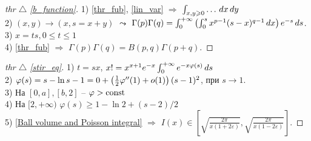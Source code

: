 \begin{minipage}[]{0.45\textwidth}
\begin{proof}[
thr $\triangle$
\eqref{b_function}]

\phantom{42}

1) \eqref{thr_fub}, \eqref{lin_var} $\Rightarrow$  $\int_{x, y \geqslant 0} \dots \, d x \, d y$ \\
2) $(x, y) \to (x, s=x+y)$ $\leadsto$ $\Gamma(p) \Gamma (q) = \int_0^{+\infty} \left(\int_0^s x^{p-1} (s-x)^{q-1} \, d x\right) e^{-s} \, d s$. \\
3) $x = ts, 0 \leq t \leq 1$ \\
4) \eqref{thr_fub} $\Rightarrow$ $\Gamma(p) \Gamma(q) = B(p, q) \Gamma(p+q)$.
\end{proof}
\end{minipage}
\hfill
\begin{minipage}[]{0.45\textwidth}
\begin{proof}[
thr $\triangle$
\eqref{stir_eq}]

\phantom{42}

1) $t = sx$, $x! = x^{x+1} e^{-x} \int_0^{+\infty} e^{-x \varphi(s)} \, d s$ \\
2) $\varphi(s) = s - \ln s - 1 = 0 + \left(\frac{1}{2} \varphi''(1)+o(1)\right) (s-1)^2 $, при $s \to 1$. \\
3) На $[0, a], [b, 2]$ -- $ \varphi > \text{const}$ \\
4) На $[2, +\infty)$ $\varphi(s) \geq 1 - \ln 2 + (s-2)/2$ \\
5) \eqref{Ball volume and Poisson integral} $\Rightarrow$ $I(x) \in 
\left[
\sqrt{\frac{2\pi}{x(1+2 \varepsilon)}}, \sqrt{\frac{2\pi}{x(1-2 \varepsilon)}}
\right]
$.
\end{proof}
\end{minipage}